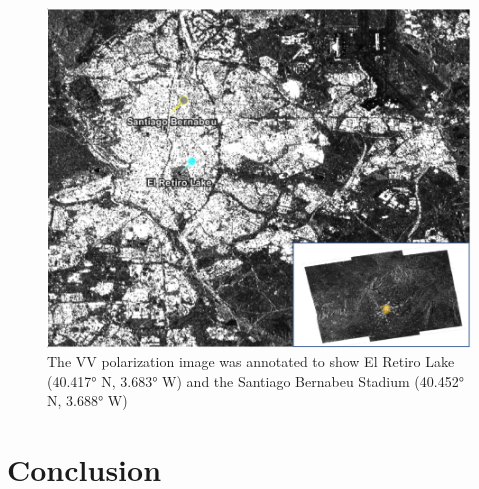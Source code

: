 \documentclass[conference]{IEEEtran}
\begin{document}
	\begin{figure}[htbp]
		\centerline{\includegraphics[scale=0.37]{Images/Madrid_Annotated.PNG}}
		\caption{The VV polarization image was annotated to show El Retiro Lake (40.417° N, 3.683° W) and the Santiago Bernabeu Stadium (40.452° N, 3.688° W)}
		\label{img:Madrid_Annotated}
	\end{figure}


	\section{Conclusion}
	





	\nocite{*}
	\printbibliography
	
\end{document}
